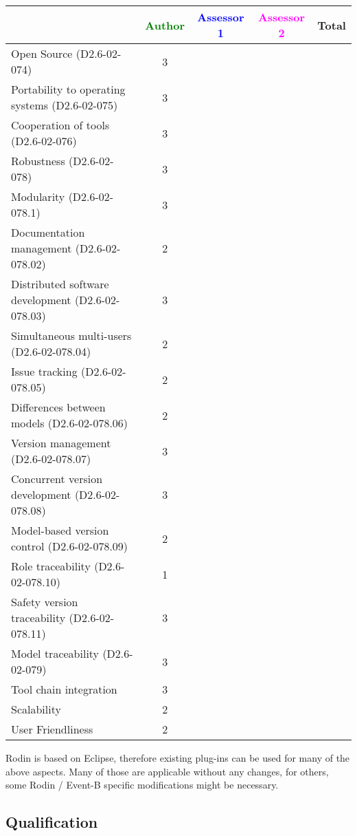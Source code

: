 \begin{tabular}{|l | c | c | c | c|}
\hline
& \textcolor{green}{Author} & \textcolor{blue}{Assessor 1} & \textcolor{magenta}{Assessor 2} & Total \\
\hline 
Open Source (D2.6-02-074) & 3 & & &  \\
\hline 
Portability to operating systems (D2.6-02-075) & 3 & & &  \\
\hline
Cooperation of tools (D2.6-02-076) & 3 & & &  \\
\hline
Robustness (D2.6-02-078) & 3 & & & \\
\hline
Modularity (D2.6-02-078.1) & 3 & & & \\
\hline
Documentation management (D2.6-02-078.02) & 2 & & & \\
\hline
Distributed software development (D2.6-02-078.03)  & 3 & & & \\
\hline
Simultaneous multi-users (D2.6-02-078.04)   & 2 & & & \\
\hline
Issue tracking (D2.6-02-078.05) & 2 & & & \\
\hline
Differences between models (D2.6-02-078.06) & 2 & & & \\
\hline
Version management (D2.6-02-078.07) & 3 & & & \\
\hline
Concurrent version development (D2.6-02-078.08) & 3 & & & \\
\hline
Model-based version control (D2.6-02-078.09) & 2 & & & \\
\hline
Role traceability (D2.6-02-078.10) & 1 & & & \\
\hline
Safety version traceability (D2.6-02-078.11) & 3 & & & \\
\hline
Model traceability (D2.6-02-079) & 3 & & & \\
\hline
Tool chain integration & 3 & & & \\
\hline
Scalability & 2 & & & \\
\hline
User Friendliness & 2 & & & \\
\hline
\end{tabular}

\begin{author_comment}
  Rodin is based on Eclipse, therefore existing plug-ins can be used for many of
  the above aspects. Many of those are applicable without any changes, for
  others, some Rodin / Event-B specific modifications might be necessary.
\end{author_comment}

\subsection{Qualification}

